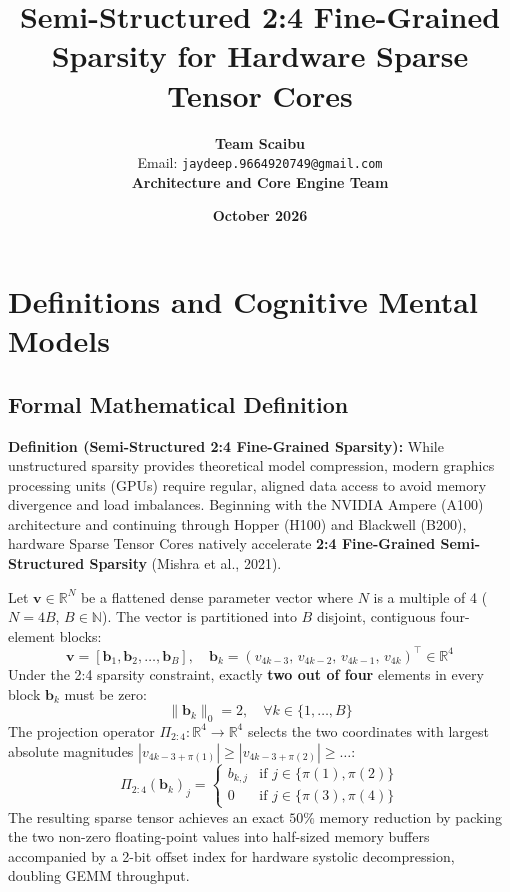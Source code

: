 \documentclass[11pt,a4paper]{article}
\title{\textbf{Semi-Structured 2:4 Fine-Grained Sparsity for Hardware Sparse Tensor Cores}}
\author{\textbf{Team Scaibu} \\ \small Email: \texttt{jaydeep.9664920749@gmail.com} \\ \small \textbf{Architecture and Core Engine Team}}
\date{\textbf{October 2026}}
\theoremstyle{definition}
\begin{document}
\maketitle

\section{Definitions and Cognitive Mental Models}

\subsection{Formal Mathematical Definition}
\textbf{Definition (Semi-Structured 2:4 Fine-Grained Sparsity):}
While unstructured sparsity provides theoretical model compression, modern graphics processing units (GPUs) require regular, aligned data access to avoid memory divergence and load imbalances. Beginning with the NVIDIA Ampere (A100) architecture and continuing through Hopper (H100) and Blackwell (B200), hardware Sparse Tensor Cores natively accelerate \textbf{2:4 Fine-Grained Semi-Structured Sparsity} (Mishra et al., 2021).

Let $\mathbf{v} \in \mathbb{R}^N$ be a flattened dense parameter vector where $N$ is a multiple of 4 ($N = 4B$, $B \in \mathbb{N}$). The vector is partitioned into $B$ disjoint, contiguous four-element blocks:
{\boldmath
\begin{equation}
\mathbf{v} = \left[ \mathbf{b}_1, \mathbf{b}_2, \dots, \mathbf{b}_B \right], \quad \mathbf{b}_k = \left( v_{4k-3}, \, v_{4k-2}, \, v_{4k-1}, \, v_{4k} \right)^\top \in \mathbb{R}^4
\end{equation}
}
Under the 2:4 sparsity constraint, exactly \textbf{two out of four} elements in every block $\mathbf{b}_k$ must be zero:
{\boldmath
\begin{equation}
\|\mathbf{b}_k\|_0 = 2, \quad \forall k \in \{1, \dots, B\}
\end{equation}
}
The projection operator $\Pi_{2:4}: \mathbb{R}^4 \to \mathbb{R}^4$ selects the two coordinates with largest absolute magnitudes $|v_{4k-3+\pi(1)}| \ge |v_{4k-3+\pi(2)}| \ge \dots$:
{\boldmath
\begin{equation}
\Pi_{2:4}(\mathbf{b}_k)_j = \begin{cases} b_{k, j} & \text{if } j \in \{ \pi(1), \pi(2) \} \\ 0 & \text{if } j \in \{ \pi(3), \pi(4) \} \end{cases}
\end{equation}
}
The resulting sparse tensor achieves an exact $50\%$ memory reduction by packing the two non-zero floating-point values into half-sized memory buffers accompanied by a 2-bit offset index for hardware systolic decompression, doubling GEMM throughput.
\end{document}

